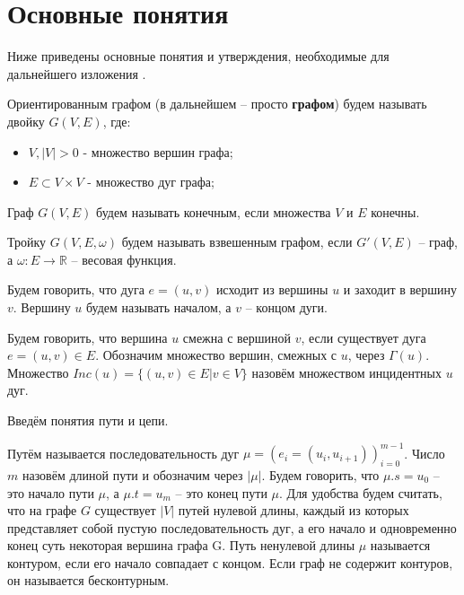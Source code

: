 \section{Основные понятия}
Ниже приведены основные понятия и утверждения, необходимые для дальнейшего изложения \cite{berzh}.

\begin{defn}
	Ориентированным графом (в дальнейшем -- просто \textbf{графом}) будем называть двойку $G (V, E)$, где:
	\begin{itemize}
		\item $V, |V|>0$ - множество вершин графа;
		\item $E \subset V \times V$ - множество дуг графа;
	\end{itemize}
\end{defn}
\begin{defn}
	Граф $G(V, E)$ будем называть конечным, если множества $V$ и $E$ конечны.
\end{defn}
\begin{defn}
	Тройку $G(V, E, \omega)$ будем называть взвешенным графом, если $G'(V, E)$ -- граф, а $\omega : E \to \mathbb{R}$ -- весовая функция.
\end{defn}
\begin{defn}
	Будем говорить, что дуга $e = (u, v)$ исходит из вершины $u$ и заходит в вершину $v$. Вершину $u$ будем называть началом, а $v$ -- концом дуги.
\end{defn} 
\begin{defn}
	Будем говорить, что вершина $u$ смежна с вершиной $v$, если существует дуга $e = (u,v) \in E$. Обозначим множество вершин, смежных с $u$, через $\Gamma(u)$. Множество $Inc(u) = \{(u, v) \in E | v \in V \}$ назовём множеством инцидентных $u$ дуг.
\end{defn} 

Введём понятия пути и цепи.

\begin{defn}
	Путём называется последовательность дуг $\mu = (e_i = (u_i, u_{i+1}))_{i = 0}^{m-1}$. Число $m$ назовём длиной пути и обозначим через $|\mu|$. Будем говорить, что $\mu.s = u_0$ -- это начало пути $\mu$, а $\mu.t = u_m$ -- это конец пути $\mu$. Для удобства будем считать, что на графе $G$ существует $|V|$ путей нулевой длины, каждый из которых представляет собой пустую последовательность дуг, а его начало и одновременно конец суть некоторая вершина графа G. Путь ненулевой длины $\mu$ называется контуром, если его начало совпадает с концом. Если граф не содержит контуров, он называется бесконтурным.
\end{defn} 

